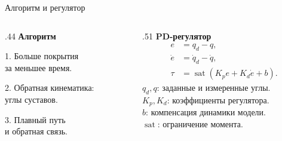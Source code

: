 \documentclass[aspectratio=169,12pt]{beamer}
\begin{document}
\begin{frame}[t]{Алгоритм и регулятор}
\vspace{2mm}
\begin{columns}[T,onlytextwidth]
\begin{column}{.44\textwidth}
\fontsize{14}{18}\selectfont
\textbf{\color{accent}Алгоритм}

\vspace{4mm}
1. Больше покрытия\\за меньшее время.

\vspace{4mm}
2. Обратная кинематика:\\углы суставов.

\vspace{4mm}
3. Плавный путь\\и обратная связь.
\end{column}
\begin{column}{.51\textwidth}
\fontsize{14}{18}\selectfont
\textbf{\color{accent}PD-регулятор}
\setlength{\abovedisplayskip}{2mm}
\setlength{\belowdisplayskip}{2mm}
\[
\begin{aligned}
e &= q_d-q,\\
\dot e &= \dot q_d-\dot q,\\
\tau &= \operatorname{sat}(K_p e+K_d\dot e+b).
\end{aligned}
\]
{\fontsize{11}{15}\selectfont\color{muted}
\(q_d,q\): заданные и измеренные углы.\\
\(K_p,K_d\): коэффициенты регулятора.\\
\(b\): компенсация динамики модели.\\
\(\operatorname{sat}\): ограничение момента.}
\end{column}
\end{columns}
\end{frame}
\end{document}
